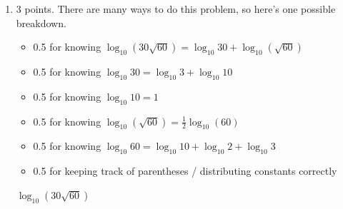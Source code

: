 \documentclass{article}
\begin{document}
\begin{enumerate}
\begin{enumerate}[resume]
    \begin{problem}[\vfill]
      $\displaystyle 5 \log_{10} \left( \frac{16}{\sqrt[4]{9}} \right)$
    \end{problem}

    \begin{solution}
      \begin{align*}
        5 \log_{10} \left( \frac{16}{\sqrt[4]{9}} \right) &=
        5\left[\log_{10} 16 - \log_{10} \sqrt[4]{9}\right] \\
        &= 5 \left[\log_{10} 16 - \log_{10} (9^{1/4})\right] \\
        &= 5 \left[\log_{10} (2^4) - \log_{10} (3^{1/2})\right] \\
        &= 5 \left[4 \log_{10} 2 - \tfrac{1}{2} \log_{10} 3 \right] \\
        &= \boxed{5(4a - \tfrac{1}{2}b)}
      \end{align*}
    \end{solution}

  \item

    \begin{grading}
      3 points. There are many ways to do this problem, so here's one possible breakdown.
      \begin{itemize}[nosep]
      \item 0.5 for knowing $\log_{10} \left(30 \sqrt{60} \right) = \log_{10} 30 + \log_{10} (\sqrt{60})$
      \item 0.5 for knowing $\log_{10} 30 = \log_{10} 3 + \log_{10} 10$
      \item 0.5 for knowing $\log_{10} 10 = 1$
      \item 0.5 for knowing $\log_{10} (\sqrt{60} ) = \frac{1}{2} \log_{10} (60)$
      \item 0.5 for knowing $\log_{10} 60 = \log_{10} 10 + \log_{10} 2 + \log_{10} 3$
      \item 0.5 for keeping track of parentheses / distributing constants correctly
      \end{itemize}
    \end{grading}

    \begin{problem}[\vfill]
      $\displaystyle \log_{10} \left(30 \sqrt{60} \right)$
    \end{problem}


\end{enumerate}
\end{enumerate}
\end{document}
